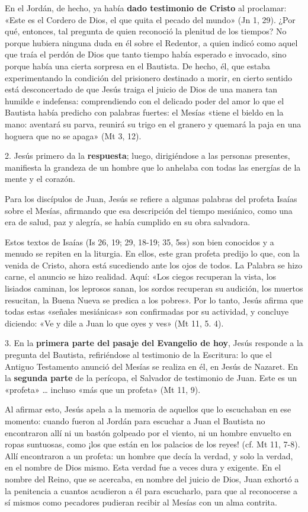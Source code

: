 \documentclass[]{article}
\begin{document}
En el Jordán, de hecho, ya había \textbf{dado testimonio de Cristo} al
proclamar: «Este es el Cordero de Dios, el que quita el pecado del
mundo» (Jn 1, 29). ¿Por qué, entonces, tal pregunta de quien reconoció
la plenitud de los tiempos? No porque hubiera ninguna duda en él sobre
el Redentor, a quien indicó como aquel que traía el perdón de Dios que
tanto tiempo había esperado e invocado, sino porque había una cierta
sorpresa en el Bautista. De hecho, él, que estaba experimentando la
condición del prisionero destinado a morir, en cierto sentido está
desconcertado de que Jesús traiga el juicio de Dios de una manera tan
humilde e indefensa: comprendiendo con el delicado poder del amor lo que
el Bautista había predicho con palabras fuertes: el Mesías «tiene el
bieldo en la mano: aventará su parva, reunirá su trigo en el granero y
quemará la paja en una hoguera que no se apaga» (Mt 3, 12).

2. Jesús primero da la \textbf{respuesta}; luego, dirigiéndose a las
personas presentes, manifiesta la grandeza de un hombre que lo anhelaba
con todas las energías de la mente y el corazón.

Para los discípulos de Juan, Jesús se refiere a algunas palabras del
profeta Isaías sobre el Mesías, afirmando que esa descripción del tiempo
mesiánico, como una era de salud, paz y alegría, se había cumplido en su
obra salvadora.

Estos textos de Isaías (Is 26, 19; 29, 18-19; 35, 5ss) son bien
conocidos y a menudo se repiten en la liturgia. En ellos, este gran
profeta predijo lo que, con la venida de Cristo, ahora está sucediendo
ante los ojos de todos. La Palabra se hizo carne, el anuncio se hizo
realidad. Aquí: «Los ciegos recuperan la vista, los lisiados caminan,
los leprosos sanan, los sordos recuperan su audición, los muertos
resucitan, la Buena Nueva se predica a los pobres». Por lo tanto, Jesús
afirma que todas estas «señales mesiánicas» son confirmadas por su
actividad, y concluye diciendo: «Ve y dile a Juan lo que oyes y ves» (Mt
11, 5. 4).

3. En la \textbf{primera parte del pasaje del Evangelio de hoy}, Jesús
responde a la pregunta del Bautista, refiriéndose al testimonio de la
Escritura: lo que el Antiguo Testamento anunció del Mesías se realiza en
él, en Jesús de Nazaret. En la \textbf{segunda parte} de la perícopa, el
Salvador de testimonio de Juan. Este es un «profeta» \ldots{} incluso
«más que un profeta» (Mt 11, 9).

Al afirmar esto, Jesús apela a la memoria de aquellos que lo escuchaban
en ese momento: cuando fueron al Jordán para escuchar a Juan el Bautista
no encontraron allí ni un bastón golpeado por el viento, ni un hombre
envuelto en ropas suntuosas, como ¡los que están en los palacios de los
reyes! (cf. Mt 11, 7-8). Allí encontraron a un profeta: un hombre que
decía la verdad, y solo la verdad, en el nombre de Dios mismo. Esta
verdad fue a veces dura y exigente. En el nombre del Reino, que se
acercaba, en nombre del juicio de Dios, Juan exhortó a la penitencia a
cuantos acudieron a él para escucharlo, para que al reconocerse a sí
mismos como pecadores pudieran recibir al Mesías con un alma contrita.
\end{document}
